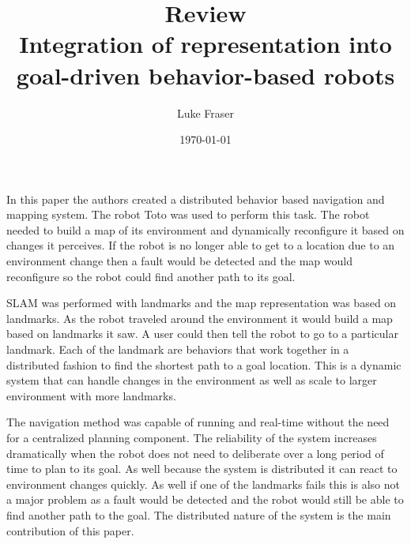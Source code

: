 \documentclass{article}
\begin{document}
\title{{\large Review} \\ Integration of representation into goal-driven behavior-based robots}
\author{Luke Fraser}
\date{\today}
\maketitle

\begingroup
\renewcommand{\section}[2]{}


\endgroup

\section*{Summary}
In this paper the authors created a distributed behavior based navigation and mapping system. The robot Toto was used to perform this task. The robot needed to build a map of its environment and dynamically reconfigure it based on changes it perceives. If the robot is no longer able to get to a location due to an environment change then a fault would be detected and the map would reconfigure so the robot could find another path to its goal.

SLAM was performed with landmarks and the map representation was based on landmarks. As the robot traveled around the environment it would build a map based on landmarks it saw. A user could then tell the robot to go to a particular landmark. Each of the landmark are behaviors that work together in a distributed fashion to find the shortest path to a goal location. This is a dynamic system that can handle changes in the environment as well as scale to larger environment with more landmarks.
\section*{Strengths}
The navigation method was capable of running and real-time without the need for a centralized planning component. The reliability of the system increases dramatically when the robot does not need to deliberate over a long period of time to plan to its goal. As well because the system is distributed it can react to environment changes quickly. As well if one of the landmarks fails this is also not a major problem as a fault would be detected and the robot would still be able to find another path to the goal. The distributed nature of the system is the main contribution of this paper.
\end{document}
